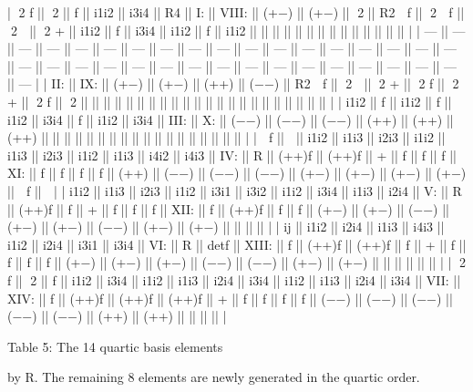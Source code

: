 \documentclass{article}
\begin{document}
| 2   f || 2   ||   f  || i1i2 || i3i4 || R4   || I:      || VIII: || (+−) || (+−)   || 2   || R2  f || 2   f || 2  || 2 +  || i1i2  ||   f   || i3i4  || i1i2  ||   f || i1i2  ||     ||      ||      ||      ||      ||      ||      ||      ||      ||      ||      ||      ||     ||     |
| ---    || ---  || ---  || ---  || ---  || ---  || ---     || ---   || ---  || ---    || ---  || ---    || ---     || ---  || ---   || ---   || ---   || ---   || ---   || --- || ---   || --- || ---  || ---  || ---  || ---  || ---  || ---  || ---  || ---  || ---  || ---  || ---  || --- || --- |
| II:    || IX:  || (+−) || (+−) || (++) || (−−) || R2   f || 2   || 2 + || 2   f || 2 + || 2   f || 2      ||      ||       ||       ||       ||       ||       ||     ||       ||     ||      ||      ||      ||      ||      ||      ||      ||      ||      ||      ||      ||     ||     |
| i1i2   ||   f  || i1i2 ||   f  || i1i2 || i3i4 ||   f     || i1i2  || i3i4 || III:   || X:   || (−−)   || (−−)    || (−−) || (++)  || (++)  || (++)  ||       ||       ||     ||       ||     ||      ||      ||      ||      ||      ||      ||      ||      ||      ||      ||      ||     ||     |
|  f    ||     || i1i2 || i1i3 || i2i3 || i1i2 || i1i3    || i2i3  || i1i2 || i1i3   || i4i2 || i4i3   || IV:     || R    || (++)f || (++)f || +     || f     || f     || f   || XI:   || f   || f    || f    || f    || (++) || (−−) || (−−) || (−−) || (+−) || (+−) || (+−) || (+−) ||  f ||    |
| i1i2   || i1i3 || i2i3 || i1i2 || i3i1 || i3i2 || i1i2    || i3i4  || i1i3 || i2i4   || V:   || R      || (++)f   || f    || +     || f     || f     || f     || XII:  || f   || (++)f || f   || f    || (+−) || (+−) || (−−) || (+−) || (+−) || (−−) || (+−) || (+−) ||      ||      ||     ||     |
| ij     || i1i2 || i2i4 || i1i3 || i4i3 || i1i2 || i2i4    || i3i1  || i3i4 || VI:    || R    || detf   || XIII:   || f    || (++)f || (++)f || f     || +     || f     || f   || f     || f   || (+−) || (+−) || (+−) || (−−) || (−−) || (+−) || (+−) ||      ||      ||      ||      ||     ||     |
| 2   f || 2   ||   f  || i1i2 || i3i4 || i1i2 || i1i3    || i2i4  || i3i4 || i1i2   || i1i3 || i2i4   || i3i4    || VII: || XIV:  || f     || (++)f || (++)f || (++)f || +   || f     || f   || f    || f    || (−−) || (−−) || (−−) || (−−) || (−−) || (++) || (++) ||      ||      ||     ||     |

Table 5: The 14 quartic basis elements

by R. The remaining 8 elements are newly generated in the quartic order.
\end{document}

